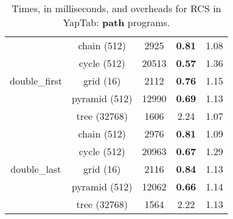 \begin{table}[ht]
{\begin{tabular}{cc|ccc}
   \multirow{5}{*}{double\_first} &  \footnotesize{chain  (512) } &  2925 &  \textbf{0.81}  &  1.08 \\
   &  \footnotesize{cycle  (512) } &  20513 &  \textbf{0.57}  &  1.36 \\
   &  \footnotesize{grid  (16) } &  2112 &  \textbf{0.76}  &  1.15 \\
   &  \footnotesize{pyramid  (512) } &  12990 &  \textbf{0.69}  &  1.13 \\
   &  \footnotesize{tree  (32768) } &  1606 &  2.24  &  1.07 \\
   \hline
   \multirow{5}{*}{double\_last} &  \footnotesize{chain  (512) } &  2976 &  \textbf{0.81}  &  1.09 \\
   &  \footnotesize{cycle  (512) } &  20963 &  \textbf{0.67}  &  1.29 \\
   &  \footnotesize{grid  (16) } &  2116 &  \textbf{0.84}  &  1.13 \\
   &  \footnotesize{pyramid  (512) } &  12062 &  \textbf{0.66}  &  1.14 \\
   &  \footnotesize{tree  (32768) } &  1564 &  2.22  &  1.13 \\
   \hline
\hline
\end{tabular}
}
\caption{Times, in milliseconds, and overheads for RCS in YapTab: \textbf{path} programs.}
\label{tbl:overhead_detail_tst}
\end{table}